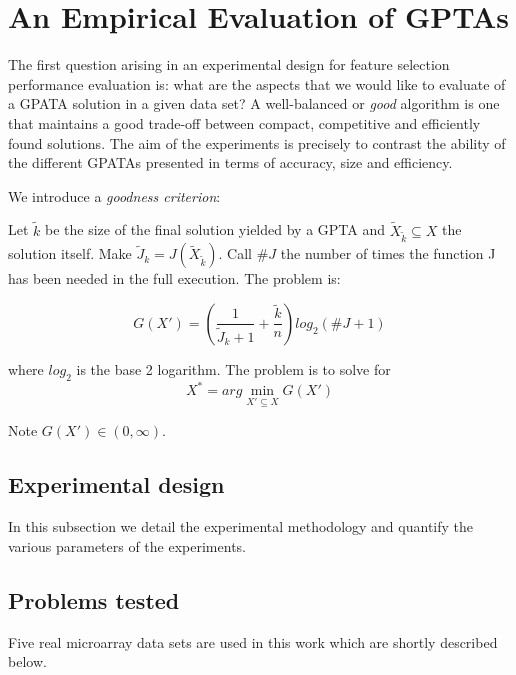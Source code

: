 \documentclass{article}
\begin{document}
\section{An Empirical Evaluation of GPTAs}
\label{section:ExperimentalDesign}

The first question arising in an experimental design for feature
selection performance evaluation is: what are the aspects that we
would like to evaluate of a GPATA solution in a given data set?  A
well-balanced or {\em good} algorithm is one that maintains a good trade-off between
compact, competitive and efficiently found solutions. 
The aim of the experiments is precisely to contrast the ability of the different GPATAs presented in terms of 
accuracy, size and efficiency.

We introduce a {\em goodness criterion}:

Let $\tilde{k}$ be the size of the final solution yielded by a GPTA and
$\tilde{X}_{\tilde{k}} \subseteq X$ the solution itself. Make
$\tilde{J}_k = J(\tilde{X}_{\tilde{k}})$. Call $\#J$ the number of times
the function J has been needed in the full execution. The problem is:

\begin{equation}
\label{tradeoff}
G(X')= \left( \frac{1}{\tilde{J}_k+1} +
\frac{\tilde{k}}{n}\right) log_2 (\#J+1)
\end{equation}

where $log_2$ is the base 2 logarithm. The problem is to solve for 
$$  X^* = arg \min\limits_{X' \subseteq X} G(X')$$

Note $G(X') \in (0,\infty)$.

\subsection{Experimental design}
In this subsection we detail the experimental methodology and quantify
the various parameters of the experiments. 


\subsection{Problems tested}
\label{section:datos}

Five real microarray data sets are used in this work which are shortly described below.
\end{document}
